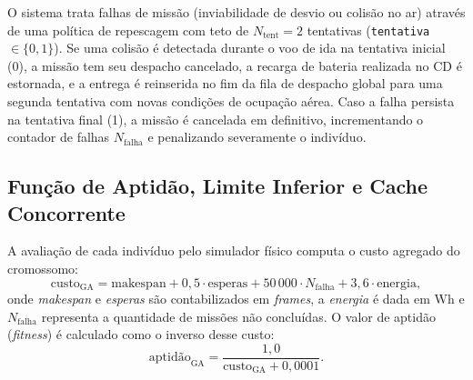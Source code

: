 O sistema trata falhas de missão (inviabilidade de desvio ou colisão no ar) através de uma política de repescagem com teto de $N_{\text{tent}} = 2$ tentativas (\texttt{tentativa} $\in \{0, 1\}$). Se uma colisão é detectada durante o voo de ida na tentativa inicial (0), a missão tem seu despacho cancelado, a recarga de bateria realizada no CD é estornada, e a entrega é reinserida no fim da fila de despacho global para uma segunda tentativa com novas condições de ocupação aérea. Caso a falha persista na tentativa final (1), a missão é cancelada em definitivo, incrementando o contador de falhas $N_{\text{falha}}$ e penalizando severamente o indivíduo.

\subsection{Função de Aptidão, Limite Inferior e Cache Concorrente}

A avaliação de cada indivíduo pelo simulador físico computa o custo agregado do cromossomo:
\begin{equation}\label{eq:custo_ga}
\text{custo}_{\text{GA}} = \text{makespan} + 0{,}5 \cdot \text{esperas} + 50\,000 \cdot N_{\text{falha}} + 3{,}6 \cdot \text{energia},
\end{equation}
onde \textit{makespan} e \textit{esperas} são contabilizados em \textit{frames}, a \textit{energia} é dada em $\text{Wh}$ e $N_{\text{falha}}$ representa a quantidade de missões não concluídas. O valor de aptidão (\textit{fitness}) é calculado como o inverso desse custo:
\begin{equation}\label{eq:fitness_ga}
\text{aptidão}_{\text{GA}} = \frac{1{,}0}{\text{custo}_{\text{GA}} + 0{,}0001}.
\end{equation}

